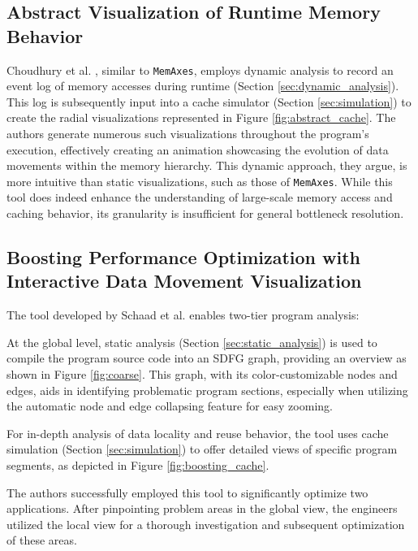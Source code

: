 \subsection{Abstract Visualization of Runtime Memory Behavior}\label{sec:abstract}
Choudhury et al. \cite{choudhury2011abstract}, similar to \texttt{MemAxes}, employs dynamic analysis to record an event log of memory accesses during runtime (Section \ref{sec:dynamic_analysis}). This log is subsequently input into a cache simulator (Section \ref{sec:simulation}) to create the radial visualizations represented in Figure \ref{fig:abstract_cache}. The authors generate numerous such visualizations throughout the program's execution, effectively creating an animation showcasing the evolution of data movements within the memory hierarchy. This dynamic approach, they argue, is more intuitive than static visualizations, such as those of \texttt{MemAxes}. While this tool does indeed enhance the understanding of large-scale memory access and caching behavior, its granularity is insufficient for general bottleneck resolution.

\subsection{Boosting Performance Optimization with Interactive Data Movement Visualization}\label{sec:boosting}
The tool developed by Schaad et al. \cite{schaad2021boosting,schaad2022boosting} enables two-tier program analysis:

At the global level, static analysis (Section \ref{sec:static_analysis}) is used to compile the program source code into an SDFG graph, providing an overview as shown in Figure \ref{fig:coarse}. This graph, with its color-customizable nodes and edges, aids in identifying problematic program sections, especially when utilizing the automatic node and edge collapsing feature for easy zooming.

For in-depth analysis of data locality and reuse behavior, the tool uses cache simulation (Section \ref{sec:simulation}) to offer detailed views of specific program segments, as depicted in Figure \ref{fig:boosting_cache}.

The authors successfully employed this tool to significantly optimize two applications. After pinpointing problem areas in the global view, the engineers utilized the local view for a thorough investigation and subsequent optimization of these areas.


